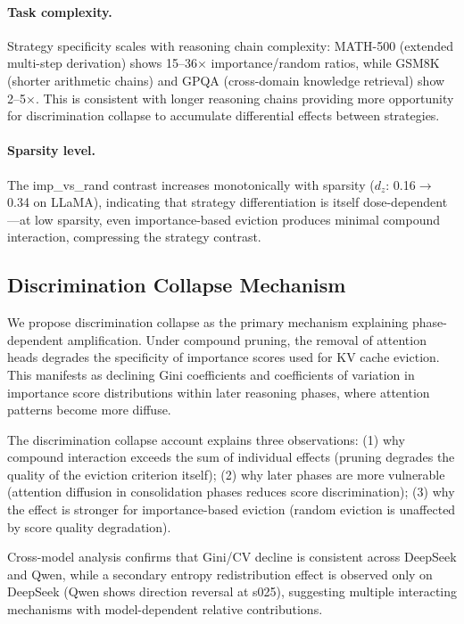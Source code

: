 \documentclass[11pt,a4paper]{article}
\begin{document}
\paragraph{Task complexity.} Strategy specificity scales with reasoning chain complexity: MATH-500 (extended multi-step derivation) shows 15--36$\times$ importance/random ratios, while GSM8K (shorter arithmetic chains) and GPQA (cross-domain knowledge retrieval) show 2--5$\times$. This is consistent with longer reasoning chains providing more opportunity for discrimination collapse to accumulate differential effects between strategies.

\paragraph{Sparsity level.} The imp\_vs\_rand contrast increases monotonically with sparsity ($d_z$: 0.16$\to$0.34 on LLaMA), indicating that strategy differentiation is itself dose-dependent---at low sparsity, even importance-based eviction produces minimal compound interaction, compressing the strategy contrast.

\subsection{Discrimination Collapse Mechanism}

We propose discrimination collapse as the primary mechanism explaining phase-dependent amplification. Under compound pruning, the removal of attention heads degrades the specificity of importance scores used for KV cache eviction. This manifests as declining Gini coefficients and coefficients of variation in importance score distributions within later reasoning phases, where attention patterns become more diffuse.

The discrimination collapse account explains three observations: (1) why compound interaction exceeds the sum of individual effects (pruning degrades the quality of the eviction criterion itself); (2) why later phases are more vulnerable (attention diffusion in consolidation phases reduces score discrimination); (3) why the effect is stronger for importance-based eviction (random eviction is unaffected by score quality degradation).

Cross-model analysis confirms that Gini/CV decline is consistent across DeepSeek and Qwen, while a secondary entropy redistribution effect is observed only on DeepSeek (Qwen shows direction reversal at s025), suggesting multiple interacting mechanisms with model-dependent relative contributions.
\end{document}
